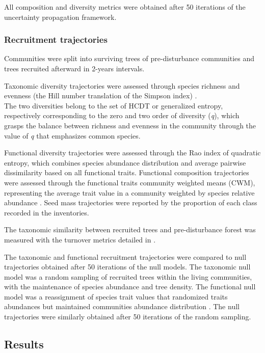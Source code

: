 \documentclass[
  11pt,
  french,
  A4paper,
  extrafontsizes,onecolumn,openright
  ]{memoir}
\begin{document}
All composition and diversity metrics were obtained after 50 iterations
of the uncertainty propagation framework.

\subsubsection{Recruitment trajectories}\label{recruitment-trajectories}

Communities were split into surviving trees of pre-disturbance
communities and trees recruited afterward in 2-years intervals.

Taxonomic diversity trajectories were assessed through species richness
and evenness (the Hill number translation of the Simpson index)
\autocites{Chao2015}{Marcon2015b}.\\
The two diversities belong to the set of HCDT or generalized entropy,
respectively corresponding to the zero and two order of diversity
(\emph{q}), which grasps the balance between richness and evenness in
the community through the value of \emph{q} that emphasizes common
species.

Functional diversity trajectories were assessed through the Rao index of
quadratic entropy, which combines species abundance distribution and
average pairwise dissimilarity based on all functional traits.
Functional composition trajectories were assessed through the functional
traits community weighted means (CWM), representing the average trait
value in a community weighted by species relative abundance
\autocite{Diaz2007}. Seed mass trajectories were reported by the
proportion of each class recorded in the inventories.

The taxonomic similarity between recruited trees and pre-disturbance
forest was measured with the turnover metrics detailed in
\textcite{Podani2013}.

The taxonomic and functional recruitment trajectories were compared to
null trajectories obtained after 50 iterations of the null models. The
taxonomic null model was a random sampling of recruited trees within the
living communities, with the maintenance of species abundance and tree
density. The functional null model was a reassignment of species trait
values that randomized traits abundances but maintained communities
abundance distribution \autocite{Mason2013}. The null trajectories were
similarly obtained after 50 iterations of the random sampling.

\subsection{Results}\label{results-2}
\end{document}
